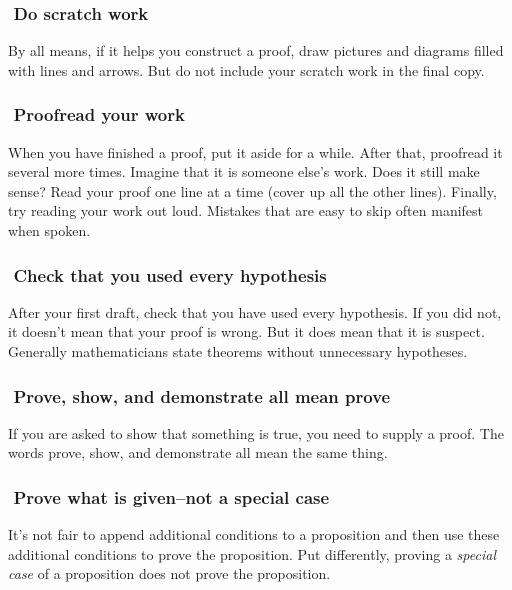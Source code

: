 \documentclass[12pt]{article}
\newcounter{ex}\setcounter{ex}{0}
\newcommand{\ex}{%
\hspace{-0.2in} \setcounter{ex}{\value{ex}+1}
\theex \,\,}
\newcounter{id}\setcounter{id}{0}
\newcounter{se}\setcounter{se}{0}
\begin{document}


\subsubsection*{\ex Do scratch work}

By all means, if it helps you construct a proof, draw pictures and
diagrams filled with lines and arrows.  But do not include your scratch
work in the final copy.

\subsubsection*{\ex Proofread your work}

When you have finished a proof, put it aside for a while.  After that,
proofread it several more times. Imagine that it is someone else's
work.  Does it still make sense?  Read your proof one line at a time
(cover up all the other lines). Finally, try reading your work out
loud. Mistakes that are easy to skip often manifest when spoken.


\subsubsection*{\ex Check that you used every hypothesis}

After your first draft, check that you have used every hypothesis.
If you did not, it doesn't mean that your proof is wrong.  But it
does mean that it is  suspect.  Generally mathematicians
state theorems without unnecessary hypotheses.

\subsubsection*{\ex Prove, show, and demonstrate all mean prove}

If you are asked to show that something is true, you need to
supply a proof.  The words prove, show, and demonstrate all mean the
same thing. 

\subsubsection*{\ex Prove what is given--not a special case}

It's not fair to append additional conditions to a proposition and 
then use these additional conditions to prove the proposition.  Put
differently, proving a {\em special case\/} of a proposition does not
prove the proposition. 
\end{document}
